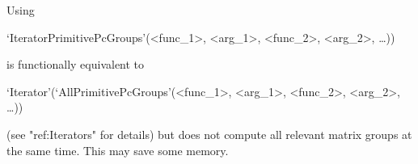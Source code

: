 Using 

`IteratorPrimitivePcGroups'(<func_1>, <arg_1>, <func_2>, <arg_2>, \dots)) 

is functionally equivalent to 

`Iterator'(`AllPrimitivePcGroups'(<func_1>, <arg_1>, <func_2>, <arg_2>, \dots))

(see "ref:Iterators" for details) but does not compute all relevant matrix groups at the same time. 
This may save some memory. 





